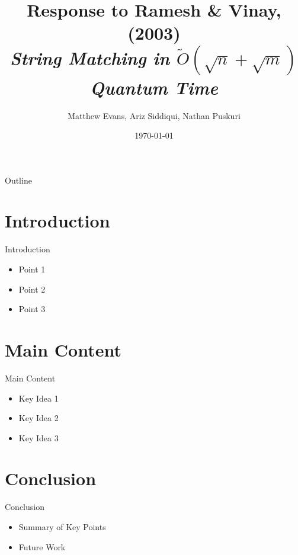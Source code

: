 \documentclass{beamer}
\title{\Large{Response to Ramesh \& Vinay, (2003)} \\
\small{\texorpdfstring{\textit{String Matching in \(\tilde{O}(\sqrt{n} + \sqrt{m})\) Quantum Time}}{String Matching in O(sqrt(n) + sqrt(m)) Quantum Time}}
}
\author{Matthew Evans, Ariz Siddiqui, Nathan Puskuri}
\date{\today}
\begin{document}
\begin{frame}
    \titlepage
\end{frame}

\begin{frame}{Outline}
    \tableofcontents
\end{frame}

\section{Introduction}
\begin{frame}{Introduction}
    \begin{itemize}
        \item Point 1
        \item Point 2
        \item Point 3
    \end{itemize}
\end{frame}

\section{Main Content}
\begin{frame}{Main Content}
    \begin{itemize}
        \item Key Idea 1
        \item Key Idea 2
        \item Key Idea 3
    \end{itemize}
\end{frame}

\section{Conclusion}
\begin{frame}{Conclusion}
    \begin{itemize}
        \item Summary of Key Points
        \item Future Work
    \end{itemize}
\end{frame}
\end{document}

